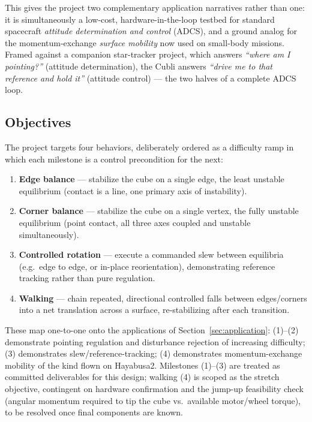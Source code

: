 This gives the project two complementary application narratives rather than one: it is simultaneously a low-cost, hardware-in-the-loop testbed for standard spacecraft \emph{attitude determination and control} (ADCS), and a ground analog for the momentum-exchange \emph{surface mobility} now used on small-body missions. Framed against a companion star-tracker project, which answers \emph{``where am I pointing?''} (attitude determination), the Cubli answers \emph{``drive me to that reference and hold it''} (attitude control) — the two halves of a complete ADCS loop.

\subsection{Objectives}
\label{sec:objectives}

The project targets four behaviors, deliberately ordered as a difficulty ramp in which each milestone is a control precondition for the next:

\begin{enumerate}
    \item \textbf{Edge balance} — stabilize the cube on a single edge, the least unstable equilibrium (contact is a line, one primary axis of instability).
    \item \textbf{Corner balance} — stabilize the cube on a single vertex, the fully unstable equilibrium (point contact, all three axes coupled and unstable simultaneously).
    \item \textbf{Controlled rotation} — execute a commanded slew between equilibria (e.g.\ edge to edge, or in-place reorientation), demonstrating reference tracking rather than pure regulation.
    \item \textbf{Walking} — chain repeated, directional controlled falls between edges/corners into a net translation across a surface, re-stabilizing after each transition.
\end{enumerate}

These map one-to-one onto the applications of Section~\ref{sec:application}: (1)–(2) demonstrate pointing regulation and disturbance rejection of increasing difficulty; (3) demonstrates slew/reference-tracking; (4) demonstrates momentum-exchange mobility of the kind flown on Hayabusa2. Milestones (1)–(3) are treated as committed deliverables for this design; walking (4) is scoped as the stretch objective, contingent on hardware confirmation and the jump-up feasibility check (angular momentum required to tip the cube vs.\ available motor/wheel torque), to be resolved once final components are known.